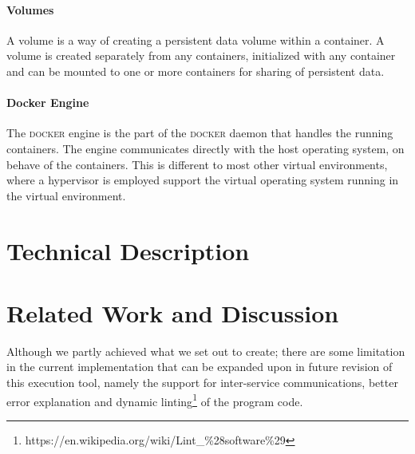 \documentclass[12pt]{article}
\newcommand{\docker}[0] {\textsc{docker}}
\begin{document}
\paragraph{Volumes} A volume is a way of creating a persistent data volume within a container. A volume is created separately from any containers, initialized with any container and can be mounted to one or more containers for sharing of persistent data.

\paragraph{Docker Engine} The \docker{} engine is the part of the \docker{} daemon that handles the running containers. The engine communicates directly with the host operating system, on behave of the containers. This is different to most other virtual environments, where a hypervisor is employed support the virtual operating system running in the virtual environment.     

\section{Technical Description}



\section{Related Work and Discussion}

Although we partly achieved what we set out to create; there are some limitation in the current implementation that can be expanded upon in future revision of this execution tool, namely the support for inter-service communications, better error explanation and dynamic linting\footnote{https://en.wikipedia.org/wiki/Lint\_\%28software\%29} of the program code.

 

\end{document}
